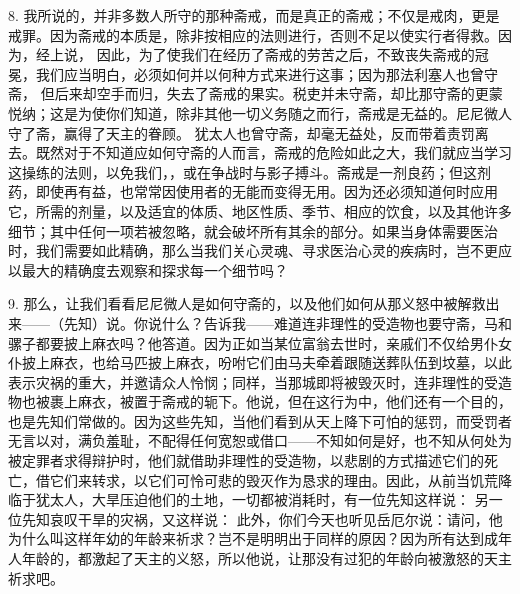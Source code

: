 8. 我所说的，并非多数人所守的那种斋戒，而是真正的斋戒；不仅是戒肉，更是戒罪。因为斋戒的本质是，除非按相应的法则进行，否则不足以使实行者得救。因为，经上说， 因此，为了使我们在经历了斋戒的劳苦之后，不致丧失斋戒的冠冕，我们应当明白，必须如何并以何种方式来进行这事；因为那法利塞人也曾守斋， 但后来却空手而归，失去了斋戒的果实。税吏并未守斋，却比那守斋的更蒙悦纳；这是为使你们知道，除非其他一切义务随之而行，斋戒是无益的。尼尼微人守了斋，赢得了天主的眷顾。 犹太人也曾守斋，却毫无益处，反而带着责罚离去。既然对于不知道应如何守斋的人而言，斋戒的危险如此之大，我们就应当学习这操练的法则，以免我们，，或在争战时与影子搏斗。斋戒是一剂良药；但这剂药，即使再有益，也常常因使用者的无能而变得无用。因为还必须知道何时应用它，所需的剂量，以及适宜的体质、地区性质、季节、相应的饮食，以及其他许多细节；其中任何一项若被忽略，就会破坏所有其余的部分。如果当身体需要医治时，我们需要如此精确，那么当我们关心灵魂、寻求医治心灵的疾病时，岂不更应以最大的精确度去观察和探求每一个细节吗？\par

9. 那么，让我们看看尼尼微人是如何守斋的，以及他们如何从那义怒中被解救出来——（先知）说。你说什么？告诉我——难道连非理性的受造物也要守斋，马和骡子都要披上麻衣吗？他答道。因为正如当某位富翁去世时，亲戚们不仅给男仆女仆披上麻衣，也给马匹披上麻衣，吩咐它们由马夫牵着跟随送葬队伍到坟墓，以此表示灾祸的重大，并邀请众人怜悯；同样，当那城即将被毁灭时，连非理性的受造物也被裹上麻衣，被置于斋戒的轭下。他说，但在这行为中，他们还有一个目的，也是先知们常做的。因为这些先知，当他们看到从天上降下可怕的惩罚，而受罚者无言以对，满负羞耻，不配得任何宽恕或借口——不知如何是好，也不知从何处为被定罪者求得辩护时，他们就借助非理性的受造物，以悲剧的方式描述它们的死亡，借它们来转求，以它们可怜可悲的毁灭作为恳求的理由。因此，从前当饥荒降临于犹太人，大旱压迫他们的土地，一切都被消耗时，有一位先知这样说： 另一位先知哀叹干旱的灾祸，又这样说： 此外，你们今天也听见岳厄尔说：请问，他为什么叫这样年幼的年龄来祈求？岂不是明明出于同样的原因？因为所有达到成年人年龄的，都激起了天主的义怒，所以他说，让那没有过犯的年龄向被激怒的天主祈求吧。\par

